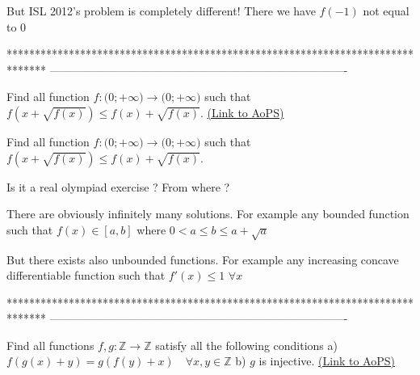 \begin{solution}
	But ISL 2012's problem is completely different!
There we have $f(-1)$ not equal to $0$
\end{solution}
*******************************************************************************
-------------------------------------------------------------------------------

\begin{problem}
	Find all function ${{f: \mathbb(0;+\infty)}\to\mathbb(0;+\infty)}$ such that $f(x+\sqrt{f(x)}){\leq}f(x)+\sqrt{f(x)}$.
	\flushright \href{https://artofproblemsolving.com/community/c6h577127}{(Link to AoPS)}
\end{problem}



\begin{solution}
	\begin{tcolorbox}Find all function ${{f: \mathbb(0;+\infty)}\to\mathbb(0;+\infty)}$ such that $f(x+\sqrt{f(x)}){\leq}f(x)+\sqrt{f(x)}$.\end{tcolorbox}
Is it a real olympiad exercise ?
From where ?

There are obviously infinitely many solutions. For example any bounded function such that $f(x)\in[a,b]$ where $0<a\le b\le a+\sqrt a$

But there exists also unbounded functions. For example any increasing concave differentiable function such that $f'(x)\le 1$ $\forall x$
\end{solution}
*******************************************************************************
-------------------------------------------------------------------------------

\begin{problem}
	Find all functions $f,g:\mathbb{Z}\to\mathbb{Z}$ satisfy all the following conditions
a) $f(g(x)+y)=g(f(y)+x) \quad \forall x,y\in\mathbb{Z}$
b) $g$ is injective.
	\flushright \href{https://artofproblemsolving.com/community/c6h577769}{(Link to AoPS)}
\end{problem}



